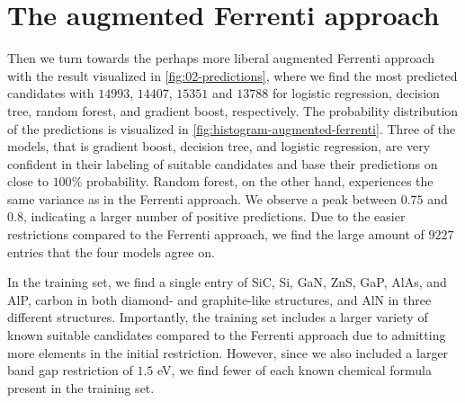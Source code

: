\begin{comment}
\begin{table}[!ht]
\centering
\caption{Table of the number of predictions made with the optimal model for the insightful approach. }
\label{tab:timing-extraction}
\noindent\makebox[\textwidth]{
\begin{tabular}{M{3.0cm} M{4.0cm} M{4.0cm}}
  \hline
  \hline
   Model & Optimal number PC & Number of predictions \\
  \hline
  Logistic regression & $145$  & $454$ \\
  Decision trees      &  $3$   & $442$ \\
  Random forest       &  $10 $ & $325$ \\
  Gradient boost      &  $7$   & $699$ \\
  \hline
  \hline
\end{tabular}
}
\end{table}
\end{comment}


\section{The augmented Ferrenti approach}
Then we turn towards the perhaps more liberal augmented Ferrenti approach with the result visualized in \autoref{fig:02-predictions}, where we find the most predicted candidates with $14993$, $14407$, $15351$ and $13788$ for logistic regression, decision tree, random forest, and gradient boost, respectively. The probability distribution of the predictions is visualized in \autoref{fig:histogram-augmented-ferrenti}. Three of the models, that is gradient boost, decision tree, and logistic regression, are very confident in their labeling of suitable candidates and base their predictions on close to $100\%$ probability. Random forest, on the other hand, experiences the same variance as in the Ferrenti approach. We observe a peak between $0.75$ and $0.8$, indicating a larger number of positive predictions. Due to the easier restrictions compared to the Ferrenti approach, we find the large amount of $9227$ entries that the four models agree on.



\noindent In the training set, we find a single entry of SiC, Si, GaN, ZnS, GaP, AlAs, and AlP, carbon in both diamond- and graphite-like structures, and AlN in three different structures. Importantly, the training set includes a larger variety of known suitable candidates compared to the Ferrenti approach due to admitting more elements in the initial restriction. However, since we also included a larger band gap restriction of $1.5$ eV, we find fewer of each known chemical formula present in the training set.


